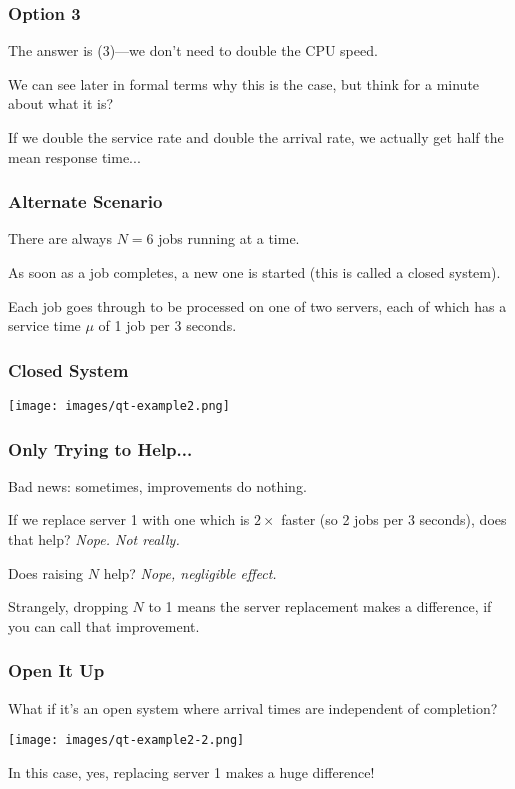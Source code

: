 \begin{frame}
\frametitle{Option 3}


The answer is (3)---we don't need to double the CPU speed. 

We can see later in formal terms why this is the case, but think for a minute about what it is? 

If we double the service rate and double the arrival rate, we actually get half the mean response time...


\end{frame}



\begin{frame}
\frametitle{Alternate Scenario}

There are always $N=6$ jobs running at a time. 

As soon as a job completes, a new one is started (this is called a \alert{closed system}). 

Each job goes through to be processed on one of two servers, each of which has a service time $\mu$ of 1 job per 3 seconds.

\end{frame}



\begin{frame}
\frametitle{Closed System}

\begin{center}
	\texttt{[image: images/qt-example2.png]}
\end{center}

\end{frame}



\begin{frame}
\frametitle{Only Trying to Help...}

Bad news: sometimes, improvements do nothing. 

If we replace server 1 with one which is $2\times$ faster (so 2 jobs per 3 seconds), does that help? \emph{Nope. Not really.}

Does raising $N$ help? \emph{Nope, negligible effect.}

Strangely, dropping $N$ to 1 means the server replacement makes a difference, if you can call that improvement.

\end{frame}



\begin{frame}
\frametitle{Open It Up}

What if it's an \alert{open system} where arrival times are independent of completion?

\begin{center}
	\texttt{[image: images/qt-example2-2.png]}
\end{center}

In this case, yes, replacing server 1 makes a huge difference!

\end{frame}



